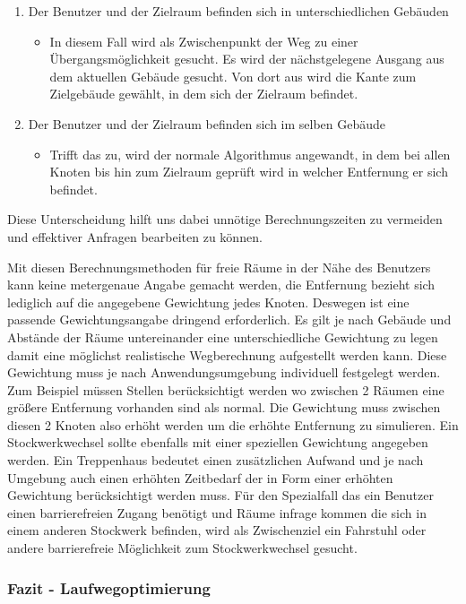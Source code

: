 \begin{enumerate}
	\item Der Benutzer und der Zielraum befinden sich in unterschiedlichen Gebäuden
	\begin{itemize}
		\item In diesem Fall wird als Zwischenpunkt der Weg zu einer Übergangsmöglichkeit gesucht.
		Es wird \zB der nächstgelegene Ausgang aus dem aktuellen Gebäude gesucht.
		Von dort aus wird die Kante zum Zielgebäude gewählt, in dem sich der Zielraum befindet.
	\end{itemize}
	\item Der Benutzer und der Zielraum befinden sich im selben Gebäude
	\begin{itemize}
		\item Trifft das zu, wird der normale Algorithmus angewandt, in dem bei allen Knoten bis
		hin zum Zielraum geprüft wird in welcher Entfernung er sich befindet.
	\end{itemize}
\end{enumerate}

Diese Unterscheidung hilft uns dabei unnötige Berechnungszeiten zu vermeiden
und effektiver Anfragen bearbeiten zu können.

Mit diesen Berechnungsmethoden für freie Räume in der Nähe des Benutzers kann
keine metergenaue Angabe gemacht werden, die Entfernung bezieht sich lediglich
auf die angegebene Gewichtung jedes Knoten. Deswegen ist eine passende
Gewichtungsangabe dringend erforderlich. Es gilt je nach Gebäude und Abstände
der Räume untereinander eine unterschiedliche Gewichtung zu legen damit eine
möglichst realistische Wegberechnung aufgestellt werden kann. Diese Gewichtung
muss je nach Anwendungsumgebung individuell festgelegt werden. Zum Beispiel
müssen Stellen berücksichtigt werden wo zwischen 2 Räumen eine größere
Entfernung vorhanden sind als normal. Die Gewichtung muss zwischen diesen
2 Knoten also erhöht werden um die erhöhte Entfernung zu simulieren.
Ein Stockwerkwechsel sollte ebenfalls mit einer speziellen Gewichtung
angegeben werden. Ein Treppenhaus bedeutet einen zusätzlichen Aufwand und je
nach Umgebung auch einen erhöhten Zeitbedarf der in Form einer erhöhten
Gewichtung berücksichtigt werden muss. Für den Spezialfall das ein Benutzer
einen barrierefreien Zugang benötigt und Räume infrage kommen die sich in
einem anderen Stockwerk befinden, wird als Zwischenziel ein Fahrstuhl oder
andere barrierefreie Möglichkeit zum Stockwerkwechsel gesucht.

\subsubsection{Fazit - Laufwegoptimierung}
\label{sec:Fazit_Laufwegoptimierung}

